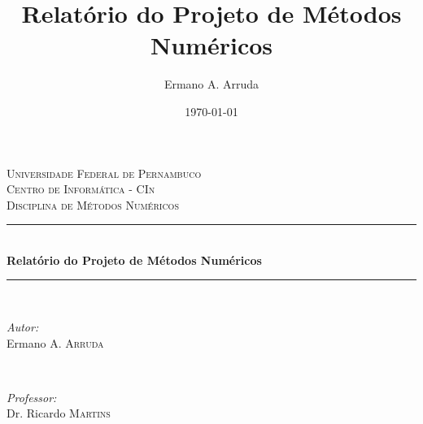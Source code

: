 \documentclass[a4paper]{article}
\title{Relatório do Projeto de Métodos Numéricos}
\author{Ermano A. Arruda}
\date{\today}
\begin{document}
\begin{titlepage}

\newcommand{\HRule}{\rule{\linewidth}{0.5mm}} %

\center %
 

\textsc{\LARGE Universidade Federal de Pernambuco}\\[1.5cm] %
\textsc{\Large Centro de Informática - CIn}\\[0.5cm] %
\textsc{\large Disciplina de Métodos Numéricos}\\[0.5cm] %


\HRule \\[0.4cm]
{ \huge \bfseries Relatório do Projeto de Métodos Numéricos}\\[0.4cm] %
\HRule \\[1.5cm]
 

\begin{minipage}{0.4\textwidth}
\begin{flushleft} \large
\emph{Autor:}\\
Ermano A. \textsc{Arruda} %
\end{flushleft}
\end{minipage}
~
\begin{minipage}{0.4\textwidth}
\begin{flushright} \large
\emph{Professor:} \\
Dr. Ricardo \textsc{Martins} %
\end{flushright}
\end{minipage}\\[4cm]



\end{titlepage}
\end{document}

